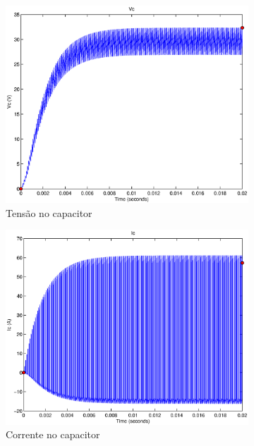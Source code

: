 \documentclass{article}
\begin{document}
\begin{figure}[H]
	\centering
	\begin{subfigure}[b]{0.4\linewidth}
		\includegraphics[width=\linewidth]{matlab/boost/b_vc}
		\caption{Tensão no capacitor}
	\end{subfigure}
	\begin{subfigure}[b]{0.4\linewidth}
		\centering
		\includegraphics[width=\linewidth]{matlab/boost/b_ic}
		\caption{Corrente no capacitor}
	\end{subfigure}
	\begin{subfigure}[b]{0.4\linewidth}

\end{subfigure}
\end{figure}
\end{document}
